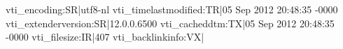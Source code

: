 vti_encoding:SR|utf8-nl
vti_timelastmodified:TR|05 Sep 2012 20:48:35 -0000
vti_extenderversion:SR|12.0.0.6500
vti_cacheddtm:TX|05 Sep 2012 20:48:35 -0000
vti_filesize:IR|407
vti_backlinkinfo:VX|

